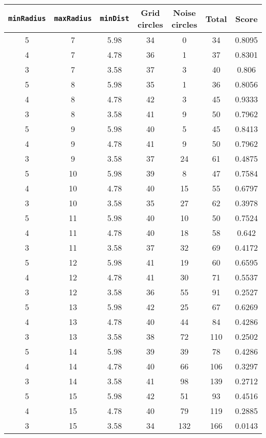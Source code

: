 \documentclass[letterpaper, 12pt]{article}
\begin{document}
\begin{longtable}{|c|c|c|c|c|c|c|}
\hline
\textbf{\texttt{minRadius}} & \textbf{\texttt{maxRadius}} & \textbf{\texttt{minDist}} & \textbf{Grid circles} & \textbf{Noise circles} & \textbf{Total} & \textbf{Score} \\
\hline
5 & 7 & 5.98 & 34 & 0 & 34 & 0.8095 \\
\hline
4 & 7 & 4.78 & 36 & 1 & 37 & 0.8301 \\
\hline
3 & 7 & 3.58 & 37 & 3 & 40 & 0.806 \\
\hline
5 & 8 & 5.98 & 35 & 1 & 36 & 0.8056 \\
\hline
4 & 8 & 4.78 & 42 & 3 & 45 & 0.9333 \\
\hline
3 & 8 & 3.58 & 41 & 9 & 50 & 0.7962 \\
\hline
5 & 9 & 5.98 & 40 & 5 & 45 & 0.8413 \\
\hline
4 & 9 & 4.78 & 41 & 9 & 50 & 0.7962 \\
\hline
3 & 9 & 3.58 & 37 & 24 & 61 & 0.4875 \\
\hline
5 & 10 & 5.98 & 39 & 8 & 47 & 0.7584 \\
\hline
4 & 10 & 4.78 & 40 & 15 & 55 & 0.6797 \\
\hline
3 & 10 & 3.58 & 35 & 27 & 62 & 0.3978 \\
\hline
5 & 11 & 5.98 & 40 & 10 & 50 & 0.7524 \\
\hline
4 & 11 & 4.78 & 40 & 18 & 58 & 0.642 \\
\hline
3 & 11 & 3.58 & 37 & 32 & 69 & 0.4172 \\
\hline
5 & 12 & 5.98 & 41 & 19 & 60 & 0.6595 \\
\hline
4 & 12 & 4.78 & 41 & 30 & 71 & 0.5537 \\
\hline
3 & 12 & 3.58 & 36 & 55 & 91 & 0.2527 \\
\hline
5 & 13 & 5.98 & 42 & 25 & 67 & 0.6269 \\
\hline
4 & 13 & 4.78 & 40 & 44 & 84 & 0.4286 \\
\hline
3 & 13 & 3.58 & 38 & 72 & 110 & 0.2502 \\
\hline
5 & 14 & 5.98 & 39 & 39 & 78 & 0.4286 \\
\hline
4 & 14 & 4.78 & 40 & 66 & 106 & 0.3297 \\
\hline
3 & 14 & 3.58 & 41 & 98 & 139 & 0.2712 \\
\hline
5 & 15 & 5.98 & 42 & 51 & 93 & 0.4516 \\
\hline
4 & 15 & 4.78 & 40 & 79 & 119 & 0.2885 \\
\hline
3 & 15 & 3.58 & 34 & 132 & 166 & 0.0143 \\

\end{longtable}
\end{document}
